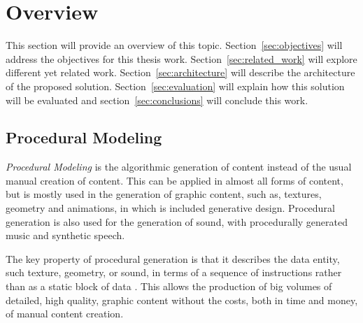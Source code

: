 
% 
% 

\section{Overview} %
\label{sec:overview}


This section will provide an overview of this topic. Section~\ref{sec:objectives} will address the objectives for this thesis work. Section~\ref{sec:related_work} will explore different yet related work. Section~\ref{sec:architecture} will describe the architecture of the proposed solution. Section~\ref{sec:evaluation} will explain how this solution will be evaluated and section~\ref{sec:conclusions} will conclude this work.

\subsection{Procedural Modeling} %
\label{sub:procedural_modeling}

\emph{Procedural Modeling} is the algorithmic generation of content instead of the usual manual creation of content. This can be applied in almost all forms of content, but is mostly used in the generation of graphic content, such as, textures, geometry and animations, in which is included generative design. Procedural generation is also used for the generation of sound, with procedurally generated music and synthetic speech.

The key property of procedural generation is that it describes the data entity, such texture, geometry, or sound, in terms of a sequence of instructions rather than as a static block of data \cite{Kelly}. This allows the production of big volumes of detailed, high quality, graphic content without the costs, both in time and money, of manual content creation.




